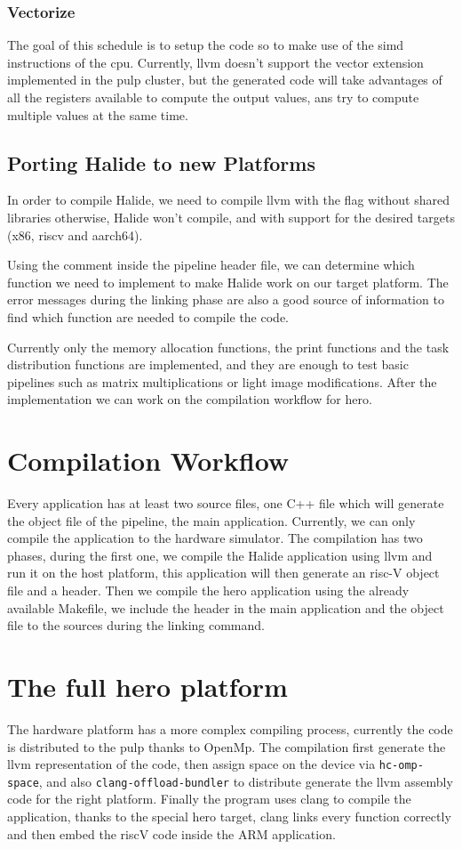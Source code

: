 	\subsubsection{Vectorize}
	The goal of this schedule is to setup the code so to make use of the \gls{simd} instructions of the \gls{cpu}. Currently, \gls{llvm} doesn't support the vector extension  implemented in the pulp cluster, but the generated code will take advantages of all the registers available to compute the output values, ans try to compute multiple values at the same time.


	\subsection { Porting Halide to new Platforms}
	In order to compile Halide, we need to compile \gls{llvm} with the flag without shared libraries otherwise, Halide won't compile, and  with support for the desired targets (x86, \gls{riscv} and \gls{aarch64}).

		Using the  comment inside the pipeline header file, we can determine which function we need to implement to make Halide work on our target platform. The error messages during the linking phase are also a good source of information to find which function are needed to compile the code. 

		Currently only the memory allocation functions, the print functions and the task distribution functions are implemented, and they are enough to  test basic pipelines such as matrix multiplications or light image modifications.
	After the implementation we can work on the compilation workflow for hero.


\section{Compilation Workflow}
	Every application has at least two source files, one C++ file which will generate the object file of the pipeline, the main application. 
	Currently, we can only compile the application to the hardware simulator.
	The compilation has two phases, during the first one, we compile the Halide application using llvm and run it on the host platform, this application will then generate an risc-V object file and a header.
	Then we compile the hero application using the already available Makefile, we include the header in the main application and the object file to the sources during the linking command.

		
\section{The full hero platform}
	The hardware platform has a more complex compiling process, currently the code is distributed to the \gls{pulp} thanks to OpenMp. The compilation first generate the llvm representation of the  code, then assign space on the device via \verb|hc-omp-space|, and also \verb|clang-offload-bundler| to distribute generate the llvm assembly code for the right platform. Finally the  program uses clang to compile the application, thanks to the special hero target, clang links every function correctly and then embed the riscV code inside the ARM application.

